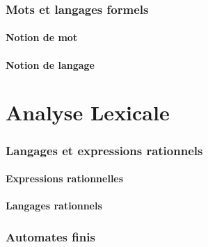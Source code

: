\documentclass[9pt]{beamer}
\begin{document}
 
\section{Mots et langages formels}
 
\subsection{Notion de mot}







 
\subsection{Notion de langage}



 
 
\part{Analyse Lexicale}
 
 
\section{Langages et expressions rationnels}
 
\subsection{Expressions rationnelles}





 
\subsection{Langages rationnels}




 
\section{Automates finis}
 
\end{document}
